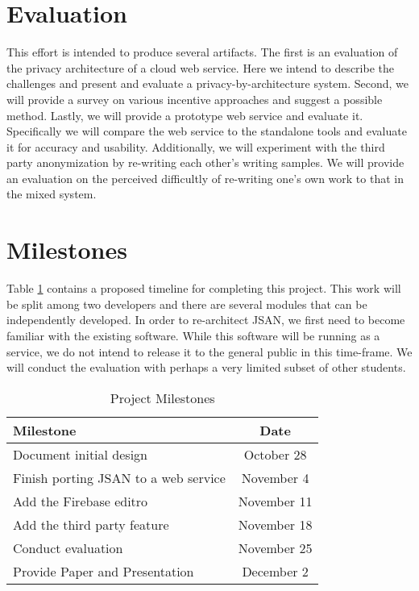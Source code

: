 \documentclass[letterpaper]{article}
\begin{document}
\section*{Evaluation}\label{sec:evaluation}
This effort is intended to produce several artifacts.  The first is an
evaluation of the privacy architecture of a cloud web service.  Here
we intend to describe the challenges and present and evaluate a
privacy-by-architecture system.  Second, we will provide a survey on
various incentive approaches and suggest a possible method.  Lastly,
we will provide a prototype web service and evaluate it.  Specifically
we will compare the web service to the standalone tools and evaluate
it for accuracy and usability.  Additionally, we will experiment with
the third party anonymization by re-writing each other's writing
samples.  We will provide an evaluation on the perceived difficultly
of re-writing one's own work to that in the mixed system.


\section*{Milestones}\label{sec:milestones}

Table \ref{tab:milestones} contains a proposed timeline for completing
this project.  This work will be split among two developers and there
are several modules that can be independently developed.  In order to
re-architect JSAN, we first need to become familiar with the existing
software.  While this software will be running as a service, we do not
intend to release it to the general public in this time-frame.  We
will conduct the evaluation with perhaps a very limited subset of
other students.


\begin{table}
  \centering
  \begin{tabular}{l | c}
    Milestone & Date\\
    \hline

    Document initial design & October 28\\
    Finish porting JSAN to a web service & November 4\\
    Add the Firebase editro & November 11\\
    Add the third party feature & November 18\\
    Conduct evaluation & November 25\\
    Provide Paper and Presentation & December 2

  \end{tabular}
  \caption{Project Milestones}
  \label{tab:milestones}
\end{table}
\end{document}
